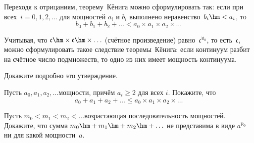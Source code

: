 Переходя к отрицаниям, теорему~Кёнига можно сформулировать так:
если при всех~$i=0,1,2,\ldots$ для мощностей $a_i$ и $b_i$
выполнено неравенство~$b_i \hm< a_i$, то
        $$
b_0 + b_1 + b_2 + \ldots < a_0 \times a_1 \times a_2\times\ldots
        $$

Учитывая, что $\mathfrak{c}\hm\times\mathfrak{c}\hm\times\ldots$
(счётное произведение) равно~$\mathfrak{c}^{\aleph_0}$,
то есть~$\mathfrak{c}$, можно сформулировать такое следствие
теоремы~Кёнига: если континуум разбит на счётное число
подмножеств, то одно из них имеет мощность континуума.

\begin{problem}
Докажите подробно это утверждение.
\end{problem}

\begin{problem}
Пусть $a_0,a_1,a_2,\ldots$\т мощности, причём $a_i\ge 2$ для всех $i$.
Покажите, что
        $$
a_0 + a_1 + a_2 + \ldots \le a_0 \times a_1 \times a_2\times\ldots
        $$
\end{problem}

\begin{problem}
Пусть $m_0 < m_1 < m_2 <\dots$\т возрастающая последовательность
мощностей. Докажите, что сумма $m_0\hm+m_1\hm+m_2\hm+\ldots$ не представима
в виде $a^{\aleph_0}$ ни для какой мощности~$a$.
\end{problem}
